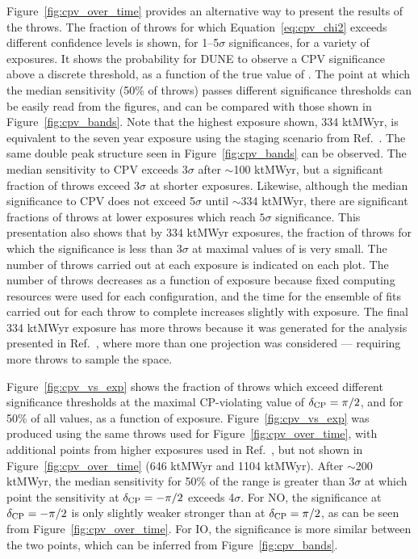 Figure~\ref{fig:cpv_over_time} provides an alternative way to present the results of the throws. The fraction of throws for which Equation~\ref{eq:cpv_chi2} exceeds different confidence levels is shown, for 1--5$\sigma$ significances, for a variety of exposures. It shows the probability for DUNE to observe a CPV significance above a discrete threshold, as a function of the true value of \deltacp. The point at which the median sensitivity (50\% of throws) passes different significance thresholds can be easily read from the figures, and can be compared with those shown in Figure~\ref{fig:cpv_bands}. Note that the highest exposure shown, 334 ktMWyr, is equivalent to the seven year exposure using the staging scenario from Ref.~\cite{Abi:2020qib}. The same double peak structure seen in Figure~\ref{fig:cpv_bands} can be observed. The median sensitivity to CPV exceeds 3$\sigma$ after $\sim$100 ktMWyr, but a significant fraction of throws exceed 3$\sigma$ at shorter exposures. Likewise, although the median significance to CPV does not exceed 5$\sigma$ until $\sim$334 ktMWyr, there are significant fractions of throws at lower exposures which reach $5\sigma$ significance. This presentation also shows that by 334 ktMWyr exposures, the fraction of throws for which the significance is less than 3$\sigma$ at maximal values of \deltacp is very small. The number of throws carried out at each exposure is indicated on each plot. The number of throws decreases as a function of exposure because fixed computing resources were used for each configuration, and the time for the ensemble of fits carried out for each throw to complete increases slightly with exposure. The final 334 ktMWyr exposure has more throws because it was generated for the analysis presented in Ref.~\cite{Abi:2020qib}, where more than one projection was considered --- requiring more throws to sample the space.

Figure~\ref{fig:cpv_vs_exp} shows the fraction of throws which exceed different significance thresholds at the maximal CP-violating value of $\delta_{\rm CP} = \pi/2$, and for 50\% of all \deltacp values, as a function of exposure. Figure~\ref{fig:cpv_vs_exp} was produced using the same throws used for Figure~\ref{fig:cpv_over_time}, with additional points from higher exposures used in Ref.~\cite{Abi:2020qib}, but not shown in Figure~\ref{fig:cpv_over_time} (646 ktMWyr and 1104 ktMWyr). After $\sim$200 ktMWyr, the median sensitivity for 50\% of the \deltacp range is greater than 3$\sigma$ at which point the sensitivity at $\delta_{\rm CP} = -\pi/2$ exceeds 4$\sigma$. For NO, the significance at $\delta_{\rm CP} = -\pi/2$ is only slightly weaker stronger than at $\delta_{\rm CP} = \pi/2$, as can be seen from Figure~\ref{fig:cpv_over_time}. For IO, the significance is more similar between the two points, which can be inferred from Figure~\ref{fig:cpv_bands}.

